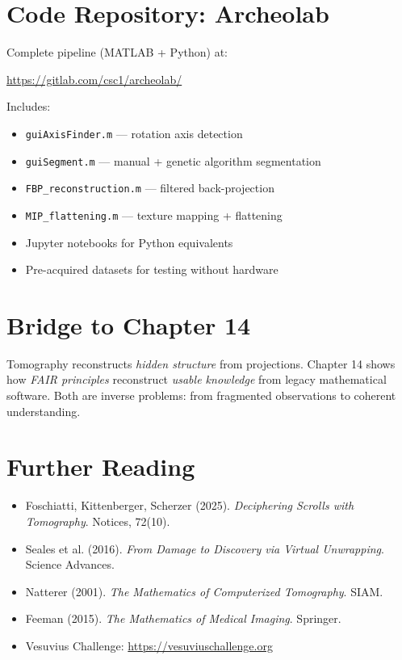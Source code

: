\section{Code Repository: Archeolab}
\label{sec:tom:archeolab}

Complete pipeline (MATLAB + Python) at:
\begin{center}
\url{https://gitlab.com/csc1/archeolab/}
\end{center}

Includes:
\begin{itemize}
    \item \texttt{guiAxisFinder.m} --- rotation axis detection
    \item \texttt{guiSegment.m} --- manual + genetic algorithm segmentation
    \item \texttt{FBP\_reconstruction.m} --- filtered back-projection
    \item \texttt{MIP\_flattening.m} --- texture mapping + flattening
    \item Jupyter notebooks for Python equivalents
    \item Pre-acquired datasets for testing without hardware
\end{itemize}

\section{Bridge to Chapter 14}
\label{sec:tom:bridge}

Tomography reconstructs \emph{hidden structure} from projections. Chapter 14 shows how \emph{FAIR principles} reconstruct \emph{usable knowledge} from legacy mathematical software. Both are inverse problems: from fragmented observations to coherent understanding.

\section{Further Reading}
\label{sec:tom:refs}

\begin{itemize}
    \item Foschiatti, Kittenberger, Scherzer (2025). \textit{Deciphering Scrolls with Tomography}. Notices, 72(10).
    \item Seales et al. (2016). \textit{From Damage to Discovery via Virtual Unwrapping}. Science Advances.
    \item Natterer (2001). \textit{The Mathematics of Computerized Tomography}. SIAM.
    \item Feeman (2015). \textit{The Mathematics of Medical Imaging}. Springer.
    \item Vesuvius Challenge: \url{https://vesuviuschallenge.org}
\end{itemize}

